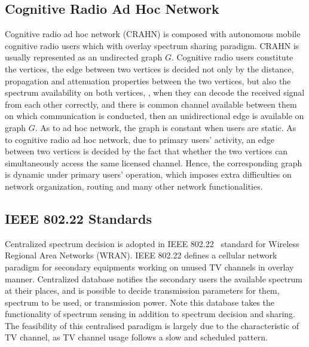 \subsection{Cognitive Radio Ad Hoc Network}


Cognitive radio ad hoc network (CRAHN) is composed with autonomous mobile cognitive radio users which with overlay spectrum sharing paradigm.
CRAHN is usually represented as an undirected graph $G$.
Cognitive radio users constitute the vertices, the edge between two vertices is decided not only by the distance, propagation and attenuation properties between the two vertices, but also the spectrum availability on both vertices, \ie, when they can decode the received signal from each other correctly, and there is common channel available between them on which communication is conducted, then an unidirectional edge is available on graph $G$.
As to ad hoc network, the graph is constant when users are static.
As to cognitive radio ad hoc network, due to primary users' activity, an edge between two vertices is decided by the fact that whether the two vertices can simultaneously access the same licensed channel.
Hence, the corresponding graph is dynamic under primary users' operation, which imposes extra difficulties on network organization, routing and many other network functionalities.

\subsection{IEEE 802.22 Standards}
Centralized spectrum decision is adopted in IEEE 802.22~\cite{802.22} standard for Wireless Regional Area Networks (WRAN).
IEEE 802.22 defines a cellular network paradigm for secondary equipments working on unused TV channels in overlay manner.
Centralized database notifies the secondary users the available spectrum at their places, and is possible to decide transmission parameters for them, \ie spectrum to be used, or transmission power.
Note this database takes the functionality of spectrum sensing in addition to spectrum decision and sharing.
The feasibility of this centralised paradigm is largely due to the characteristic of TV channel, as TV channel usage follows a slow and scheduled pattern. 

